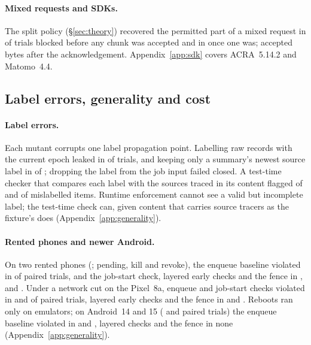 \paragraph{Mixed requests and SDKs.}\label{sec:eval-acra} The split policy (\S\ref{sec:theory}) recovered the permitted
part of a mixed request in \splitPreRecovered{} of \splitTrials{} trials blocked before any chunk was accepted and in
\splitPostRecovered{} once one was; \splitAfterAck{} accepted bytes after the acknowledgement. Appendix~\ref{app:sdk}
covers ACRA~5.14.2 and Matomo~4.4.

\subsection{Label errors, generality and cost}
\label{sec:eval-generality}
\paragraph{Label errors.} Each mutant corrupts one label propagation point. Labelling raw records with the current epoch
leaked in \mutTwoLeak{} of \mutTwoTrials{} trials, and keeping only a summary's newest source label in \mutOneLeak{} of
\mutOneTrials{}; dropping the label from the job input failed closed. A test-time checker that compares each label with
the sources traced in its content flagged \mutTwoFlagged{} of \mutTwoWrong{} and \mutOneFlagged{} of \mutOneWrong{}
mislabelled items. Runtime enforcement cannot see a valid but incomplete label; the test-time check can, given content
that carries source tracers as the fixture's does (Appendix~\ref{app:generality}).

\paragraph{Rented phones and newer Android.} On two rented phones (\devModel{}; pending, kill and revoke), the enqueue
baseline violated in \devLifeEnqViol{} of \devLifeEnqN{} paired trials, and the job-start check, layered early checks and
the fence in \devLifeStartViol{}, \devLifeLayerViol{} and \devLifeFenceViol{}. Under a network cut on the Pixel~8a,
enqueue and job-start checks violated in \dfNetEnq{} and \dfNetStart{} of \dfNetN{} paired trials, layered early checks
and the fence in \dfNetLayer{} and \dfNetFence{}. Reboots ran only on emulators; on Android~14 and 15
(\lifeFourteenTrials{} and \lifeFifteenTrials{} paired trials) the enqueue baseline violated in \lifeFourteenEnq{} and
\lifeFifteenEnq{}, layered checks and the fence in none (Appendix~\ref{app:generality}).

